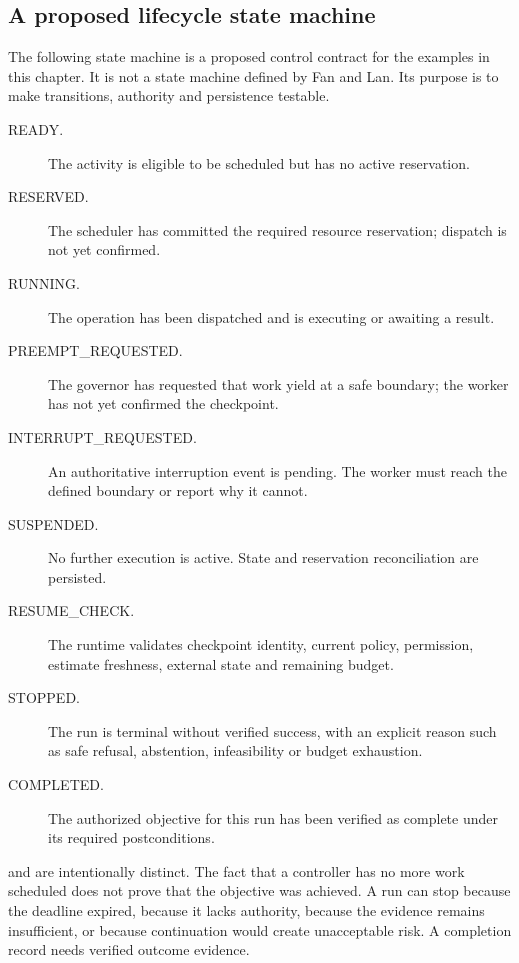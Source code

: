 \subsection{A proposed lifecycle state machine}
\label{sec:ch16-state-machine}

\EngineeringLabel{} The following state machine is a proposed control contract for the examples in this chapter. It is not a state machine defined by Fan and Lan. Its purpose is to make transitions, authority and persistence testable.

\begin{description}
  \item[READY.] The activity is eligible to be scheduled but has no active reservation.
  \item[RESERVED.] The scheduler has committed the required resource reservation; dispatch is not yet confirmed.
  \item[RUNNING.] The operation has been dispatched and is executing or awaiting a result.
  \item[PREEMPT\_REQUESTED.] The governor has requested that work yield at a safe boundary; the worker has not yet confirmed the checkpoint.
  \item[INTERRUPT\_REQUESTED.] An authoritative interruption event is pending. The worker must reach the defined boundary or report why it cannot.
  \item[SUSPENDED.] No further execution is active. State and reservation reconciliation are persisted.
  \item[RESUME\_CHECK.] The runtime validates checkpoint identity, current policy, permission, estimate freshness, external state and remaining budget.
  \item[STOPPED.] The run is terminal without verified success, with an explicit reason such as safe refusal, abstention, infeasibility or budget exhaustion.
  \item[COMPLETED.] The authorized objective for this run has been verified as complete under its required postconditions.
\end{description}

\texttt{} and \texttt{} are intentionally distinct. The fact that a controller has no more work scheduled does not prove that the objective was achieved. A run can stop because the deadline expired, because it lacks authority, because the evidence remains insufficient, or because continuation would create unacceptable risk. A completion record needs verified outcome evidence.

